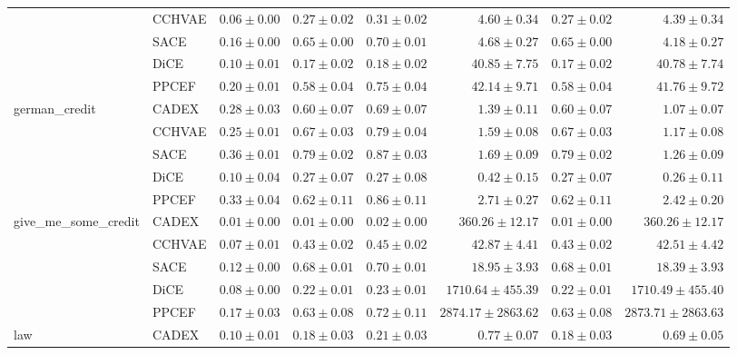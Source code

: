 \begin{table}[ht]
\begin{center}
\begin{sc}
\begin{scriptsize}
\begin{tabular}{l|l|rrrrrr}
 & CCHVAE & $\boldsymbol{0.06\pm{0.00}}$ & $0.27\pm{0.02}$ & $0.31\pm{0.02}$ & $\boldsymbol{4.60\pm{0.34}}$ & $0.27\pm{0.02}$ & $4.39\pm{0.34}$ \\
 & SACE & $0.16\pm{0.00}$ & $0.65\pm{0.00}$ & $0.70\pm{0.01}$ & $4.68\pm{0.27}$ & $0.65\pm{0.00}$ & $\boldsymbol{4.18\pm{0.27}}$ \\
 & DiCE & $0.10\pm{0.01}$ & $0.17\pm{0.02}$ & $\boldsymbol{0.18\pm{0.02}}$ & $40.85\pm{7.75}$ & $0.17\pm{0.02}$ & $40.78\pm{7.74}$ \\
 & PPCEF & $0.20\pm{0.01}$ & $0.58\pm{0.04}$ & $0.75\pm{0.04}$ & $42.14\pm{9.71}$ & $0.58\pm{0.04}$ & $41.76\pm{9.72}$ \\
\midrule
\multirow{5}{*}{german\_credit} & CADEX & $0.28\pm{0.03}$ & $0.60\pm{0.07}$ & $0.69\pm{0.07}$ & $1.39\pm{0.11}$ & $0.60\pm{0.07}$ & $1.07\pm{0.07}$ \\
 & CCHVAE & $0.25\pm{0.01}$ & $0.67\pm{0.03}$ & $0.79\pm{0.04}$ & $1.59\pm{0.08}$ & $0.67\pm{0.03}$ & $1.17\pm{0.08}$ \\
 & SACE & $0.36\pm{0.01}$ & $0.79\pm{0.02}$ & $0.87\pm{0.03}$ & $1.69\pm{0.09}$ & $0.79\pm{0.02}$ & $1.26\pm{0.09}$ \\
 & DiCE & $\boldsymbol{0.10\pm{0.04}}$ & $\boldsymbol{0.27\pm{0.07}}$ & $\boldsymbol{0.27\pm{0.08}}$ & $\boldsymbol{0.42\pm{0.15}}$ & $\boldsymbol{0.27\pm{0.07}}$ & $\boldsymbol{0.26\pm{0.11}}$ \\
 & PPCEF & $0.33\pm{0.04}$ & $0.62\pm{0.11}$ & $0.86\pm{0.11}$ & $2.71\pm{0.27}$ & $0.62\pm{0.11}$ & $2.42\pm{0.20}$ \\
\midrule
\multirow{5}{*}{give\_me\_some\_credit} & CADEX & $\boldsymbol{0.01\pm{0.00}}$ & $\boldsymbol{0.01\pm{0.00}}$ & $\boldsymbol{0.02\pm{0.00}}$ & $360.26\pm{12.17}$ & $\boldsymbol{0.01\pm{0.00}}$ & $360.26\pm{12.17}$ \\
 & CCHVAE & $0.07\pm{0.01}$ & $0.43\pm{0.02}$ & $0.45\pm{0.02}$ & $42.87\pm{4.41}$ & $0.43\pm{0.02}$ & $42.51\pm{4.42}$ \\
 & SACE & $0.12\pm{0.00}$ & $0.68\pm{0.01}$ & $0.70\pm{0.01}$ & $\boldsymbol{18.95\pm{3.93}}$ & $0.68\pm{0.01}$ & $\boldsymbol{18.39\pm{3.93}}$ \\
 & DiCE & $0.08\pm{0.00}$ & $0.22\pm{0.01}$ & $0.23\pm{0.01}$ & $1710.64\pm{455.39}$ & $0.22\pm{0.01}$ & $1710.49\pm{455.40}$ \\
 & PPCEF & $0.17\pm{0.03}$ & $0.63\pm{0.08}$ & $0.72\pm{0.11}$ & $2874.17\pm{2863.62}$ & $0.63\pm{0.08}$ & $2873.71\pm{2863.63}$ \\
\midrule
\multirow{5}{*}{law} & CADEX & $0.10\pm{0.01}$ & $0.18\pm{0.03}$ & $0.21\pm{0.03}$ & $\boldsymbol{0.77\pm{0.07}}$ & $0.18\pm{0.03}$ & $\boldsymbol{0.69\pm{0.05}}$ \\

\end{tabular}
\end{scriptsize}
\end{sc}
\end{center}
\end{table}
